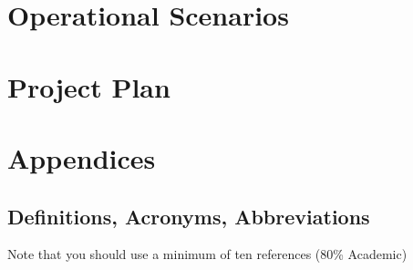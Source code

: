 \documentclass[12pt]{article}
\begin{document}




\section{Operational Scenarios}

\section{Project Plan}


\section{Appendices}

\subsection{Definitions, Acronyms, Abbreviations}


\printbibliography
Note that you should use a minimum of ten references (80\% Academic)
\end{document}
